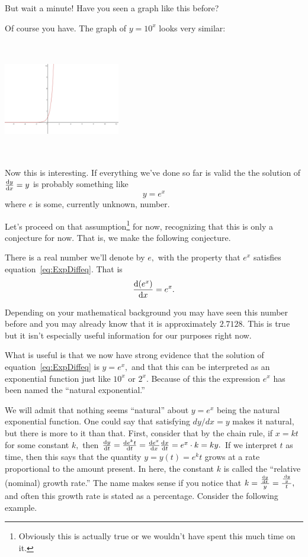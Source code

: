 But wait a minute! Have you seen a graph like this before?

Of course you have. The graph of $y=10^x$ looks very similar:\\
\centerline{\includegraphics*[height=2in,width=2in]{Figures/TenToTheX}}
Now this is interesting. If everything we've done so far is valid the
the solution of $\frac{\text{d}{y}}{\text{d}{x}}=y$ is probably something like
$$
y=e^x
$$
where $e$ is some, currently unknown, number.

Let's proceed on that assumption\footnote{Obviously this is actually
  true or we wouldn't have spent this much time on it.} for now,
recognizing that this is only a conjecture for now. That is, we make
the following conjecture.

\begin{myconjecture}
  There is a real number we'll denote by $e,$ with the property that
  $e^x$ satisfies equation~\ref{eq:ExpDiffeq}. That is
$$
\frac{\text{d}{(e^x)}}{\text{d}{x}} = e^x.
$$
\end{myconjecture}

Depending on your mathematical background you may have seen this
number before and you may already know that it is approximately
$2.7128.$ This is true but it isn't especially useful information for
our purposes right now.

What is useful is that we now have strong evidence that the solution
of equation~\ref{eq:ExpDiffeq} is $y=e^x,$  and that this can be
interpreted as an exponential function just like $10^x$ or $2^x.$
Because of this the expression $e^x$ has been named the ``natural
exponential.''

We will admit that nothing seems ``natural'' about $y=e^x$ being the
natural exponential function.  One could say that satisfying $dy/dx=y$
makes it natural, but there is more to it than that.  First, consider
that by the chain rule, if $x=kt$ for some constant $k,$ then
$\frac{\text{d}{y}}{\text{d}{t}}=\frac{\text{d}{e^kt}}{\text{d}{t}}=\frac{\text{d}{e^x}}{\text{d}{x}}\frac{\text{d}{x}}{\text{d}{t}}=e^x\cdot{}k=ky.$
If we interpret $t$ as time, then this says that the quantity
$y=y(t)=e^kt$ grows at a rate proportional to the amount present.  In
here, the constant $k$ is called the ``relative (nominal) growth
rate.''  The name makes sense if you notice that
$k=\frac{\frac{\text{d}{y}}{\text{d}{t}}}{y}=\frac {\frac{\thinspace{\rm d}y}{y}}{t},$ and often this
growth rate is stated as a percentage.  Consider the following
example.

